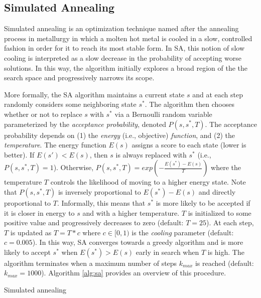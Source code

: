 \subsection{Simulated Annealing}\label{sec:sa}

Simulated annealing is an optimization technique named after the annealing process in metallurgy in which a molten hot metal is cooled in a slow, controlled fashion in order for it to reach its most stable form.
In SA, this notion of slow cooling is interpreted as a slow decrease in the probability of accepting worse solutions.
In this way, the algorithm initially explores a broad region of the the search space and progressively narrows its scope.

More formally, the SA algorithm maintains a current state $s$ and at each step randomly considers some neighboring state $s^*$.
The algorithm then chooses whether or not to replace $s$ with $s^*$ via a Bernoulli random variable parameterized by the \emph{acceptance probability}, denoted $P(s, s^*, T)$. %
The acceptance probability depends on (1) the \emph{energy} (i.e., objective) \emph{function}, and (2) the \emph{temperature}.
The energy function $E(s)$ assigns a score to each state (lower is better).
If $E(s') < E(s)$, then $s$ is always replaced with $s^*$ (i.e., $P(s, s^*, T) = 1$).
Otherwise, $P(s, s^*, T) = exp(-\frac{E(s^*) - E(s)}{T})$ where the temperature $T$ controls the likelihood of moving to a higher energy state.
Note that $P(s, s^*, T)$ is inversely proportional to $E(s^*) - E(s)$ and directly proportional to $T$.
Informally, this means that $s^*$ is more likely to be accepted if it is closer in energy to $s$ and with a higher temperature.
$T$ is initialized to some positive value and progressively decreases to zero (default: $T = 25$).
At each step, $T$ is updated as $T = T * c$ where $c \in [0, 1)$ is the \emph{cooling} parameter (default: $c = 0.005$). %
In this way, SA converges towards a greedy algorithm and is more likely to accept $s^*$ when $E(s^*) > E(s)$ early in search when $T$ is high.
The algorithm terminates when a maximum number of steps $k_{max}$ is reached (default: $k_{max} = 1000$).
Algorithm \ref{alg:sa} provides an overview of this procedure.

\begin{algorithm}[t]
  \caption{Simulated annealing
    \label{alg:sa}}
  \begin{algorithmic}[1]
        \EndIf
      \EndFor
      \State {}
    \EndFunction
  \end{algorithmic}
\end{algorithm}

